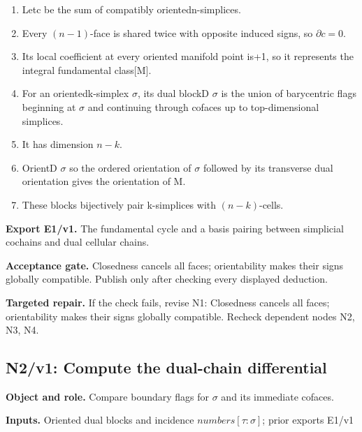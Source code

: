 \documentclass[preprint,12pt,aps,pra,showkeys,amsmath,amssymb,superscriptaddress,floatfix]{revtex4-2}
\theoremstyle{definition}
\theoremstyle{remark}
\newcommand{\field}[2]{\par\smallskip\noindent\textbf{#1.} #2\par}
\begin{document}
\begin{enumerate}[label=N1.\arabic*,leftmargin=3.4em]

\item Letc be the sum of compatibly orientedn-simplices.

\item Every \((n-1)\)-face is shared twice with opposite induced signs, so
\(\partial c=0\).

\item Its local coefficient at every oriented manifold point is+1, so it
represents the integral fundamental class{[}M{]}.

\item For an orientedk-simplex \(\sigma\), its dual blockD \(\sigma\) is the
union of barycentric flags beginning at \(\sigma\) and continuing
through cofaces up to top-dimensional simplices.

\item It has dimension \(n-k\).

\item OrientD \(\sigma\) so the ordered orientation of \(\sigma\) followed by
its transverse dual orientation gives the orientation of M.

\item These blocks bijectively pair k-simplices with \((n-k)\)-cells.

\end{enumerate}

\field{Export E1/v1}{The fundamental cycle and a basis pairing between simplicial cochains
and dual cellular chains.}

\field{Acceptance gate}{Closedness cancels all faces; orientability makes their signs globally
compatible. Publish only after checking every displayed deduction.}

\field{Targeted repair}{If the check fails, revise N1: Closedness cancels all faces;
orientability makes their signs globally compatible. Recheck dependent
nodes N2, N3, N4.}

\clearpage

\subsection{N2/v1: Compute the dual-chain differential}

\field{Object and role}{Compare boundary flags for \(\sigma\) and its immediate cofaces.}

\field{Inputs}{Oriented dual blocks and incidence \(numbers[\tau :\sigma ]\); prior
exports E1/v1}
\end{document}
